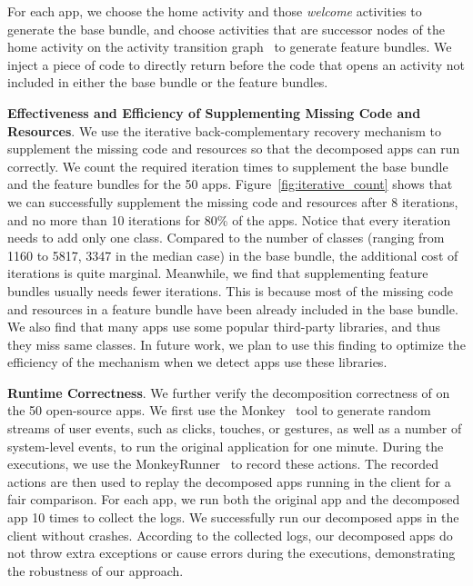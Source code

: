 For each app, we choose the home activity and those \emph{welcome} activities to generate the base bundle, and choose activities that are successor nodes of the home activity on the activity transition graph~\cite{OOPSLA13Azim} to generate feature bundles. We inject a piece of code to directly return before the code that opens an activity not included in either the base bundle or the feature bundles.

\noindent \textbf{Effectiveness and Efficiency of Supplementing Missing Code and Resources}.  We use the iterative back-complementary recovery mechanism to supplement the missing code and resources so that the decomposed apps can run correctly. We count the required iteration times to supplement the base bundle and the feature bundles for the 50 apps. Figure~\ref{fig:iterative_count} shows that we can successfully supplement the missing code and resources after 8 iterations, and no more than 10 iterations for 80\% of the apps. Notice that every iteration needs to add only one class. Compared to the number of classes (ranging from 1160 to 5817, 3347 in the median case) in the base bundle, the additional cost of iterations is quite marginal. Meanwhile, we find that supplementing feature bundles usually needs fewer iterations. This is because most of the missing code and resources in a feature bundle have been already included in the base bundle. We also find that many apps use some popular third-party libraries, and thus they miss same classes. In future work, we plan to use this finding to optimize the efficiency of the mechanism when we detect apps use these libraries.


\noindent \textbf{Runtime Correctness}. We further verify the decomposition correctness of \nickName{} on the 50 open-source apps. 
We first use the Monkey~\cite{monkey} tool to generate random streams of user events, such as clicks, touches, or gestures, as well as a number of system-level events, to run the original application for one minute. 
During the executions, we use the MonkeyRunner~\cite{monkeyrunner} to record these actions.
The recorded actions are then used to replay the decomposed apps running in the \nickName{} client for a fair comparison. 
For each app, we run both the original app and the decomposed app 10 times to collect the logs. 
We successfully run our decomposed apps in the \nickName{} client without crashes. 
According to the collected logs, our decomposed apps do not throw extra exceptions or cause errors during the executions, demonstrating the robustness of our approach.

